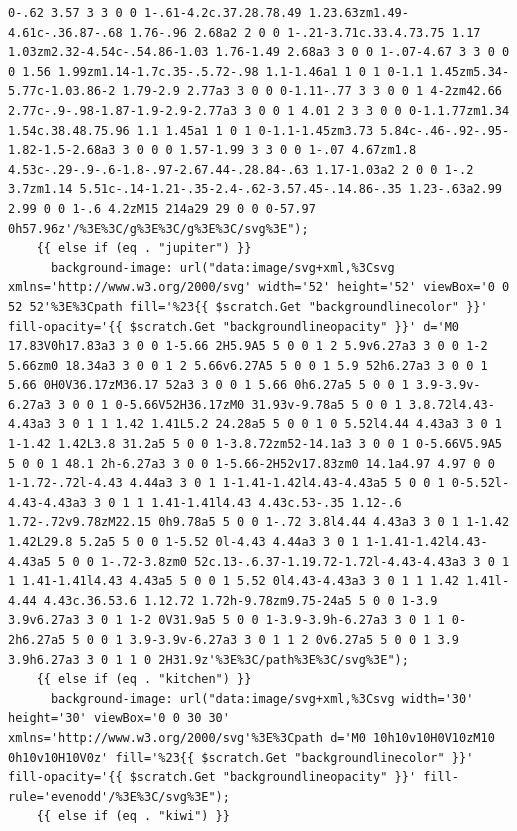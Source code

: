 \documentclass[11pt]{article}
\begin{document}
\begin{enumerate}
\begin{verbatim}
0-.62 3.57 3 3 0 0 1-.61-4.2c.37.28.78.49 1.23.63zm1.49-4.61c-.36.87-.68 1.76-.96 2.68a2 2 0 0 1-.21-3.71c.33.4.73.75 1.17 1.03zm2.32-4.54c-.54.86-1.03 1.76-1.49 2.68a3 3 0 0 1-.07-4.67 3 3 0 0 0 1.56 1.99zm1.14-1.7c.35-.5.72-.98 1.1-1.46a1 1 0 1 0-1.1 1.45zm5.34-5.77c-1.03.86-2 1.79-2.9 2.77a3 3 0 0 0-1.11-.77 3 3 0 0 1 4-2zm42.66 2.77c-.9-.98-1.87-1.9-2.9-2.77a3 3 0 0 1 4.01 2 3 3 0 0 0-1.1.77zm1.34 1.54c.38.48.75.96 1.1 1.45a1 1 0 1 0-1.1-1.45zm3.73 5.84c-.46-.92-.95-1.82-1.5-2.68a3 3 0 0 0 1.57-1.99 3 3 0 0 1-.07 4.67zm1.8 4.53c-.29-.9-.6-1.8-.97-2.67.44-.28.84-.63 1.17-1.03a2 2 0 0 1-.2 3.7zm1.14 5.51c-.14-1.21-.35-2.4-.62-3.57.45-.14.86-.35 1.23-.63a2.99 2.99 0 0 1-.6 4.2zM15 214a29 29 0 0 0-57.97 0h57.96z'/%3E%3C/g%3E%3C/g%3E%3C/svg%3E");
    {{ else if (eq . "jupiter") }}
      background-image: url("data:image/svg+xml,%3Csvg xmlns='http://www.w3.org/2000/svg' width='52' height='52' viewBox='0 0 52 52'%3E%3Cpath fill='%23{{ $scratch.Get "backgroundlinecolor" }}' fill-opacity='{{ $scratch.Get "backgroundlineopacity" }}' d='M0 17.83V0h17.83a3 3 0 0 1-5.66 2H5.9A5 5 0 0 1 2 5.9v6.27a3 3 0 0 1-2 5.66zm0 18.34a3 3 0 0 1 2 5.66v6.27A5 5 0 0 1 5.9 52h6.27a3 3 0 0 1 5.66 0H0V36.17zM36.17 52a3 3 0 0 1 5.66 0h6.27a5 5 0 0 1 3.9-3.9v-6.27a3 3 0 0 1 0-5.66V52H36.17zM0 31.93v-9.78a5 5 0 0 1 3.8.72l4.43-4.43a3 3 0 1 1 1.42 1.41L5.2 24.28a5 5 0 0 1 0 5.52l4.44 4.43a3 3 0 1 1-1.42 1.42L3.8 31.2a5 5 0 0 1-3.8.72zm52-14.1a3 3 0 0 1 0-5.66V5.9A5 5 0 0 1 48.1 2h-6.27a3 3 0 0 1-5.66-2H52v17.83zm0 14.1a4.97 4.97 0 0 1-1.72-.72l-4.43 4.44a3 3 0 1 1-1.41-1.42l4.43-4.43a5 5 0 0 1 0-5.52l-4.43-4.43a3 3 0 1 1 1.41-1.41l4.43 4.43c.53-.35 1.12-.6 1.72-.72v9.78zM22.15 0h9.78a5 5 0 0 1-.72 3.8l4.44 4.43a3 3 0 1 1-1.42 1.42L29.8 5.2a5 5 0 0 1-5.52 0l-4.43 4.44a3 3 0 1 1-1.41-1.42l4.43-4.43a5 5 0 0 1-.72-3.8zm0 52c.13-.6.37-1.19.72-1.72l-4.43-4.43a3 3 0 1 1 1.41-1.41l4.43 4.43a5 5 0 0 1 5.52 0l4.43-4.43a3 3 0 1 1 1.42 1.41l-4.44 4.43c.36.53.6 1.12.72 1.72h-9.78zm9.75-24a5 5 0 0 1-3.9 3.9v6.27a3 3 0 1 1-2 0V31.9a5 5 0 0 1-3.9-3.9h-6.27a3 3 0 1 1 0-2h6.27a5 5 0 0 1 3.9-3.9v-6.27a3 3 0 1 1 2 0v6.27a5 5 0 0 1 3.9 3.9h6.27a3 3 0 1 1 0 2H31.9z'%3E%3C/path%3E%3C/svg%3E");
    {{ else if (eq . "kitchen") }}
      background-image: url("data:image/svg+xml,%3Csvg width='30' height='30' viewBox='0 0 30 30' xmlns='http://www.w3.org/2000/svg'%3E%3Cpath d='M0 10h10v10H0V10zM10 0h10v10H10V0z' fill='%23{{ $scratch.Get "backgroundlinecolor" }}' fill-opacity='{{ $scratch.Get "backgroundlineopacity" }}' fill-rule='evenodd'/%3E%3C/svg%3E");
    {{ else if (eq . "kiwi") }}

\end{verbatim}
\end{enumerate}
\end{document}
